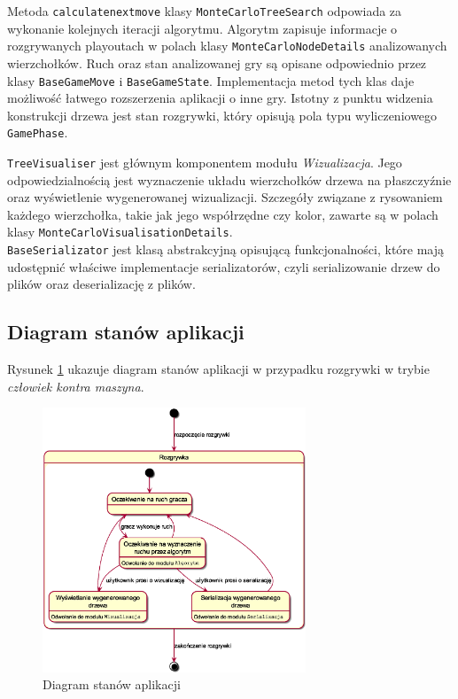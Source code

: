 \documentclass{article}
\newcommand{\code}[1]{\colorbox{light-gray}{\texttt{#1}}}
\newcommand{\modulename}[1]{\textit{#1}}
\begin{document}
	\noindent Metoda \code{calculate\textunderscore next\textunderscore move} klasy \code{MonteCarloTreeSearch} odpowiada za wykonanie kolejnych iteracji algorytmu. Algorytm zapisuje informacje o rozgrywanych playoutach w polach klasy \code{MonteCarloNodeDetails} analizowanych wierzchołków. Ruch oraz stan analizowanej gry są opisane odpowiednio przez klasy \code{BaseGameMove} i \code{BaseGameState}. Implementacja metod tych klas daje możliwość łatwego rozszerzenia aplikacji o inne gry. Istotny z punktu widzenia konstrukcji drzewa jest stan rozgrywki, który opisują pola typu wyliczeniowego \code{GamePhase}.
	
	\clearpage
	
	\noindent \code{TreeVisualiser} jest głównym komponentem modułu \modulename{Wizualizacja}. Jego odpowiedzialnością jest wyznaczenie układu wierzchołków drzewa na płaszczyźnie oraz wyświetlenie wygenerowanej wizualizacji. Szczegóły związane z rysowaniem każdego wierzchołka, takie jak jego współrzędne czy kolor, zawarte są w polach klasy \code{MonteCarloVisualisationDetails}.\\
	
	\noindent \code{BaseSerializator} jest klasą abstrakcyjną opisującą funkcjonalności, które mają udostępnić właściwe implementacje serializatorów, czyli serializowanie drzew do plików oraz deserializację z plików.
	
	
	\subsection{Diagram stanów aplikacji}
	\noindent Rysunek \ref{rys:statediagram} ukazuje diagram stanów aplikacji w przypadku rozgrywki w trybie \modulename{człowiek kontra maszyna}. 
	\begin{figure}[h]
		\centering
		\includegraphics[width=0.7\textwidth]{statediagram}
		\caption{Diagram stanów aplikacji}
		\label{rys:statediagram}
	\end{figure}
\end{document}
